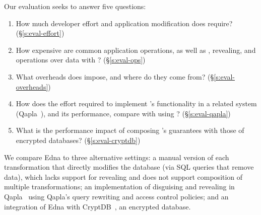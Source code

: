 Our evaluation seeks to answer five questions:
%
\begin{enumerate}[nosep]
 \item How much developer effort and application modification does \sys require? (\S\ref{s:eval-effort})
%
\item How expensive are common application operations, as well as
  \xxing, revealing, and operations over \xxed data with \sys? (\S\ref{s:eval-ops})

\item What overheads does \sys impose, and where do they come from?
    (\S\ref{s:eval-overheads})

\item 
    How does the effort required to implement \sys's
    functionality in a related system (Qapla~\cite{qapla}),
    and its performance, compare with using \sys?
    (\S\ref{s:eval-qapla})

\item 
    What is the performance impact of composing \sys's guarantees
    with those of encrypted databases?
        (\S\ref{s:eval-cryptdb})
%
\end{enumerate}

We compare Edna to three alternative settings:
\one{} a manual version
of each \xxing transformation that directly modifies the database
(\eg via SQL queries that remove data), which
lacks support for revealing and does not support
composition of multiple transformations;
\two{} an implementation of disguising and revealing in Qapla~\cite{qapla}
using Qapla’s query rewriting and access control policies; and \three{} an integration of Edna with CryptDB~\cite{cryptdb}, an encrypted database.

%

%
%
%
%

